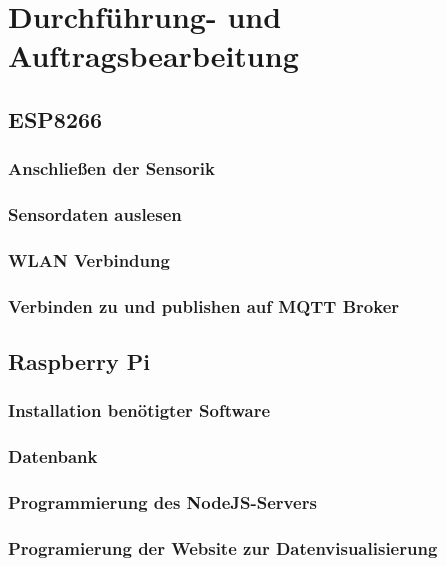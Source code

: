 \chapter{Durchführung- und Auftragsbearbeitung}
\label{cha:Durchfuehrung_und_Auftragsbearbeitung}

\section{ESP8266}
	\subsection{Anschließen der Sensorik}
	
	\subsection{Sensordaten auslesen}
	
	\subsection{WLAN Verbindung}
	
	\subsection{Verbinden zu und publishen auf MQTT Broker}
	
	
\section{Raspberry Pi}
	\subsection{Installation benötigter Software}
	
	\subsection{Datenbank}
	
	\subsection{Programmierung des NodeJS-Servers}
	
	\subsection{Programierung der Website zur Datenvisualisierung}
	
	
